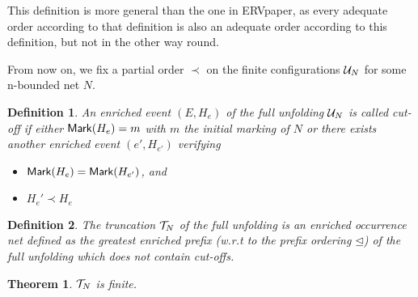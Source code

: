 \documentclass{article}
\newtheorem{definition}{Definition}
\newtheorem{theorem}{Theorem}
\begin{document}
This definition is more general than the one in  ERVpaper, as every adequate order according to that
definition is also an adequate order according to this definition, but not in
the other way round.

From now on, we fix a partial order $\prec$ on the finite configurations
$\mathcal{U}_{N}$ for some n-bounded net $N$.

\begin{definition} An enriched event $(E, H_e)$ of the full unfolding $\mathcal{U}_{N}$
is called \emph{cut-off} if either $\mathsf{Mark }{(H_e)} = m$ with $m$ the initial
marking of $N$ or there exists another enriched event $(e', H_{e'})$ verifying
\begin{itemize} \item $\mathsf{Mark }{(H_e)} = \mathsf{Mark }{(H_{e'})}$, and \item $H_e' \prec
H_e$ \end{itemize}
\end{definition}

\begin{definition} The \emph{truncation} $\mathcal{T}_{N}$ of the full unfolding is
an enriched occurrence net defined as the greatest enriched prefix (w.r.t to
the prefix ordering $\unlhd$) of the full unfolding which does not contain
cut-offs.
\end{definition}

\begin{theorem} $\mathcal{T}_{N}$ is finite.
\end{theorem}
\end{document}

